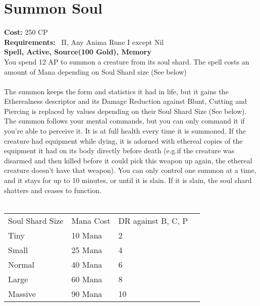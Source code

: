 \section{Summon Soul}
\textbf{Cost:} 250 CP\\
\textbf{Requirements:}~ II, Any Anima Rune I except Nil\\
\textbf{Spell, Active, Source(100 Gold), Memory}\\
You spend 12 AP to summon a creature from its soul shard.
The spell costs an amount of Mana depending on Soul Shard size (See below)\\
\\
The summon keeps the form and statistics it had in life, but it gains the Etherealness descriptor and its Damage Reduction against Blunt, Cutting and Piercing is replaced by values depending on their Soul Shard Size (See below).
The summon follows your mental commands, but you can only command it if you're able to perceive it.
It is at full health every time it is summoned.
If the creature had equipment while dying, it is adorned with ethereal copies of the equipment it had on its body directly before death (e.g.if the creature was disarmed and then killed before it could pick this weapon up again, the ethereal creature doesn't have that weapon).
You can only control one summon at a time, and it stays for up to 10 minutes, or until it is slain.
If it is slain, the soul shard shatters and ceases to function.\\
\\
\begin{longtable}{l | l | p{5.5cm} | p{2.5cm}}
    Soul Shard Size & Mana Cost & DR against B, C, P\\
    Tiny & 10 Mana & 2\\
    Small & 25 Mana & 4\\
    Normal & 40 Mana & 6\\
    Large & 60 Mana & 8\\
    Massive & 90 Mana & 10\\
\end{longtable}
